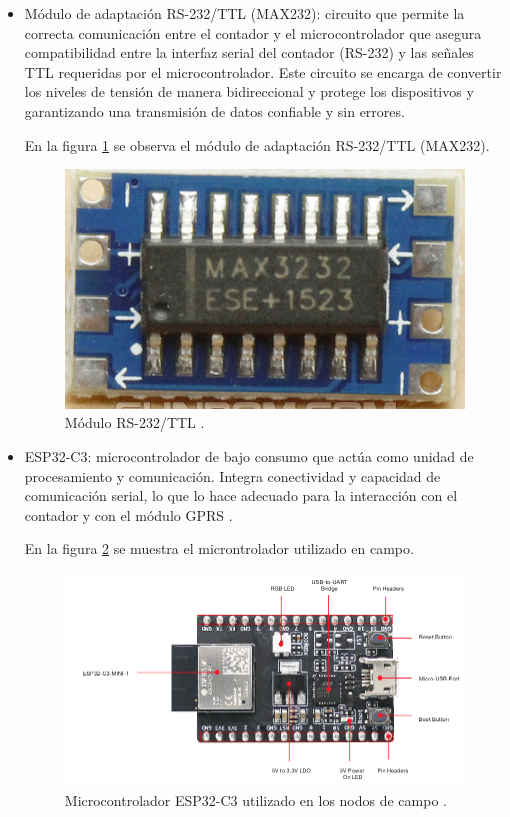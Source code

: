 \begin{itemize}
 \item Módulo de adaptación RS-232/TTL (MAX232): circuito que permite la correcta comunicación entre el contador y el microcontrolador que asegura compatibilidad entre la interfaz serial del contador (RS-232) y las señales TTL requeridas por el microcontrolador. Este circuito se encarga de convertir los niveles de tensión de manera bidireccional y protege los dispositivos y garantizando una transmisión de datos confiable y sin errores.
 
  En la figura \ref{fig:foto_max232} se observa el módulo de adaptación RS-232/TTL (MAX232).


\begin{figure}[H]
  \centering
  \includegraphics[width=0.4\linewidth]{./Figures/fotoMax232.png}
  \caption{Módulo RS-232/TTL \protect\footnotemark.}
  \label{fig:foto_max232}
\end{figure}

     


\item ESP32-C3: microcontrolador de bajo consumo que actúa como unidad de procesamiento y comunicación. Integra conectividad y capacidad de comunicación serial, lo que lo hace adecuado para la interacción con el contador y con el módulo GPRS \cite{esp32c3IDF}.

En la figura \ref{fig:esp32} se muestra el microntrolador utilizado en campo.

\begin{figure}[H]
  \centering
  \includegraphics[width=0.85\linewidth]{./Figures/fotoEsp32c3.png}
  \caption{Microcontrolador ESP32-C3 utilizado en los nodos de campo \protect\footnotemark.}
  \label{fig:esp32}
\end{figure}


\end{itemize}
